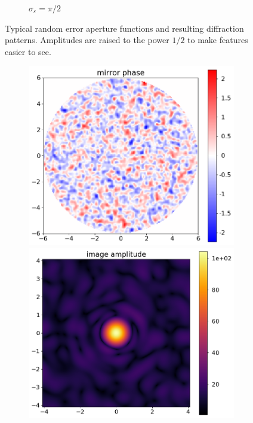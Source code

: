 \documentclass{article}
\newcommand{\eps}{\varepsilon}
\begin{document}
\begin{figure}
\begin{subfigure}{0.5\textwidth}
\begin{minipage}{0.5\textwidth}
        \end{minipage}
        \caption{$\sigma_{\eps} = \pi/2$}\label{fig:randpic:2}
    \end{subfigure}
    \caption{Typical random error aperture functions and resulting diffraction patterns. Amplitudes are raised to the power $1/2$ to make features easier to see.}\label{fig:randpic}
\end{figure}

\begin{figure}
    \centering
    \begin{subfigure}{0.5\textwidth}
        \begin{minipage}{0.5\textwidth}
            \centering
            \includegraphics[width=\textwidth]{pictures/error_pics/errors2in_phase.png}
        \end{minipage}%
        \begin{minipage}{0.5\textwidth}
            \centering
            \includegraphics[width=\textwidth]{pictures/error_pics/errors2out_abs.png}

\end{minipage}
\end{subfigure}
\end{figure}
\end{document}
